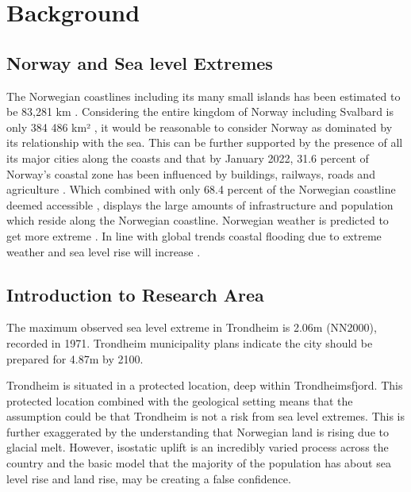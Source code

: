 \chapter{Background}

\section{Norway and Sea level Extremes}
The Norwegian coastlines including its many small islands has been estimated to be 83,281 km \cite{aunan_strong_2008}. Considering the entire kingdom of Norway including Svalbard is only 384 486 km² \cite{engelien_area_2022}, it would be reasonable to consider Norway as dominated by its relationship with the sea. This can be further supported by the presence of all its major cities along the coasts and that by January 2022, 31.6 percent of Norway's coastal zone has been influenced by buildings, railways, roads and agriculture \cite{engebakken_construction_2022}. Which combined with only 68.4 percent of the Norwegian coastline deemed accessible \cite{engebakken_construction_2022}, displays the large amounts of infrastructure and population which reside along the Norwegian coastline. Norwegian weather is predicted to get more extreme \cite{rod_integrated_2012}. In line with global trends coastal flooding due to extreme weather and sea level rise will increase \cite{hoffken_effects_2020}. 

\section{Introduction to Research Area}

The maximum observed sea level extreme in Trondheim is 2.06m (NN2000), recorded in 1971. Trondheim municipality plans indicate the city should be prepared for 4.87m by 2100. 

Trondheim is situated in a protected location, deep within Trondheimsfjord. This protected location combined with the geological setting means that the assumption could be that Trondheim is not a risk from sea level extremes. This is further exaggerated by the understanding that Norwegian land is rising due to glacial melt. However, isostatic uplift is an incredibly varied process across the country and the basic model that the majority of the population has about sea level rise and land rise, may be creating a false confidence. 

